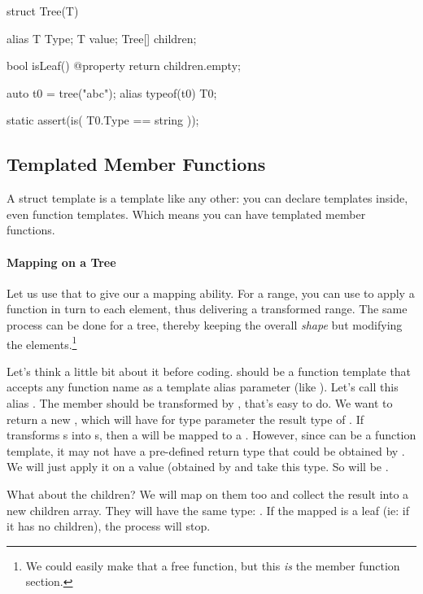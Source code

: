 \begin{dcode}
struct Tree(T)
{
    alias T Type;
    T value;
    Tree[] children;

    bool isLeaf() @property { return children.empty;}
}     

auto t0 = tree("abc");
alias typeof(t0) T0;

static assert(is( T0.Type == string ));
\end{dcode}

\subsection{Templated Member Functions}\label{membertemplates}

A struct template is a template like any other: you can declare templates inside, even function templates. Which means you can have templated member functions. 

\paragraph{Mapping on a Tree} Let us use that to give our  a mapping ability. For a range, you can use  to apply a function in turn to each element, thus delivering a transformed range. The same process can be done for a tree, thereby keeping the overall \emph{shape} but modifying the elements.\footnote{ We could easily make that a free function, but this \emph{is} the member function section.}

Let's think a little bit about it before coding.  should be a function template that accepts any function name as a template alias parameter (like ). Let's call this alias . The  member should be transformed by , that's easy to do. We want to return a new , which will have for type parameter the result type of . If  transforms s into s, then a  will be mapped to a . However, since  can be a function template, it may not have a pre-defined return type that could be obtained by . We will just apply it on a  value (obtained by  and take this type. So  will be .

What about the children? We will map  on them too and collect the result into a new children array. They will have the same type: . If the mapped  is a leaf (ie: if it has no children), the process will stop.


